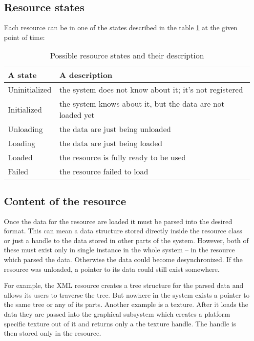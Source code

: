 \subsection{Resource states}

Each resource can be in one of the states described in the table \ref{tab:resource-states} at the given point of time:
\begin{table}[htbp]
	\centering
	{\scriptsize 
	\begin{tabular}{|p{0.13\hsize}|p{0.58\hsize}|}
	  \hline
	  A state & A description \\
		\hline
		Uninitialized & the system does not know about it; it's not registered \\
		Initialized & the system knows about it, but the data are not loaded yet \\
		Unloading & the data are just being unloaded \\
		Loading & the data are just being loaded \\
		Loaded & the resource is fully ready to be used \\
		Failed & the resource failed to load \\
		\hline
	\end{tabular}
	}
	\caption[Possible resource states]{Possible resource states and their description}
	\label{tab:resource-states}
\end{table}

\subsection{Content of the resource}

Once the data for the resource are loaded it must be parsed into the desired format. This can mean a data structure stored directly inside the resource class or just a handle to the data stored in other parts of the system. However, both of these must exist only in single instance in the whole system -- in the resource which parsed the data. Otherwise the data could become desynchronized. If the resource was unloaded, a pointer to its data could still exist somewhere. 

For example, the XML resource creates a tree structure for the parsed data and allows its users to traverse the tree. But nowhere in the system exists a pointer to the same tree or any of its parts. Another example is a texture. After it loads the data they are passed into the graphical subsystem which creates a platform specific texture out of it and returns only a the texture handle. The handle is then stored only in the resource.


